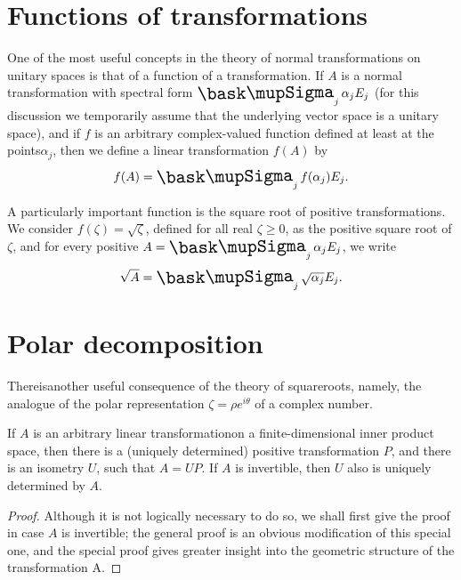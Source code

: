 {\section{Functions of transformations}

One of the most useful concepts in the theory of normal transformations on unitary spaces is that of a function of a transformation. If \(A\) is a normal transformation with spectral form \(\sumx_j \alpha_j E_j\) (for this discussion we temporarily assume that the underlying vector space is a unitary space), and if \(f\) is an arbitrary complex-valued function defined at least at the points\(\alpha_j\), then we define a linear transformation \(f(A)\) by
\begin{equation*}
    f(A) = \sumx_j f(\alpha_j) E_j.
\end{equation*}

A particularly important function is the square root of positive transformations. We consider \(f(\zeta) = \sqrt{\zeta}\), defined for all real \(\zeta \geq 0\), as the positive square root of \(\zeta\), and for every positive \(A = \sumx_j \alpha_j E_j\), we write
\begin{equation*}
    \sqrt{A} = \sumx_j \sqrt{\alpha_j} E_j.
\end{equation*}


\section{Polar decomposition}

Thereisanother useful consequence of the theory of squareroots, namely, the analogue of the polar representation \(\zeta = \rho e^{i\theta}\) of a complex number.

\begin{theorem}
    If \(A\) is an arbitrary linear transformationon a finite-dimensional inner product space, then there is a (uniquely determined) positive transformation \(P\), and there is an isometry \(U\), such that \(A = UP\). If \(A\) is invertible, then \(U\) also is uniquely determined by \(A\).
\end{theorem}

\begin{proof}
    Although it is not logically necessary to do so, we shall first give the
    proof in case \(A\) is invertible; the general proof is an obvious
    modification of this special one, and the special proof gives greater
    insight into the geometric structure of the transformation A.


\end{proof}}
